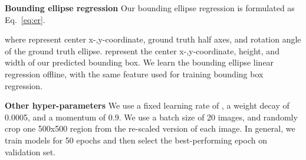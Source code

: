 \documentclass[10pt,twocolumn,letterpaper]{article}
\begin{document}
{\bf Bounding ellipse regression} Our bounding ellipse regression is formulated as Eq.~\eqref{eq:er}. 

where  represent center x-,y-coordinate, ground truth half axes, and rotation angle of the ground truth ellipse.  represent the center x-,y-coordinate, height, and width of our predicted bounding box. We learn the bounding ellipse linear regression offline, with the same feature used for training bounding box regression.

{\bf Other hyper-parameters} We use a fixed learning rate of , a weight decay of 0.0005, and a momentum of 0.9. We use a batch size of 20 images, and randomly crop one 500x500 region from the re-scaled version of each image. In general, we train models for 50 epochs and then select the best-performing epoch on validation set.

\clearpage

{
  \small
  
  
}
\end{document}
